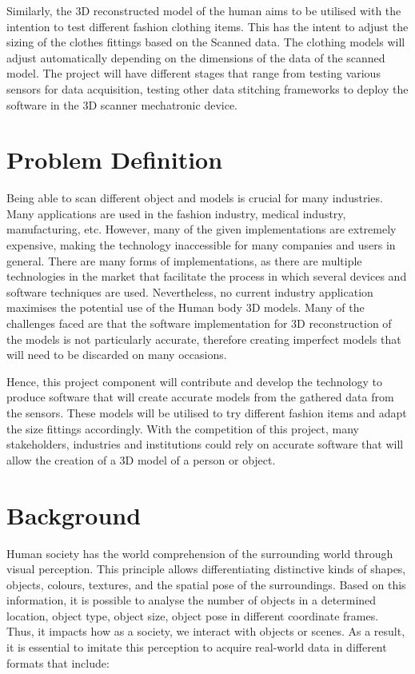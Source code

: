 \documentclass[12pt]{report}
\begin{document}
Similarly,  the 3D reconstructed model of the human aims to be utilised with the intention to test different fashion clothing items. This has the intent to adjust the sizing of the clothes fittings based on the Scanned data. The clothing models will adjust automatically depending on the dimensions of the data of the scanned model. 
The project will have different stages that range from testing various sensors for data acquisition, testing other data stitching frameworks to deploy the software in the 3D scanner mechatronic device.

\section{Problem Definition}
Being able to scan different object and models is crucial for many industries. Many applications are used in the fashion industry, medical industry, manufacturing, etc. However, many of the given implementations are extremely expensive,  making the technology inaccessible for many companies and users in general. 
There are many forms of implementations, as there are multiple technologies in the market that facilitate the process in which several devices and software techniques are used. Nevertheless,  no current industry application maximises the potential use of the Human body 3D models.
Many of the challenges faced are that the software implementation for 3D reconstruction of the models is not particularly accurate, therefore creating imperfect models that will need to be discarded on many occasions.

Hence, this project component will contribute and develop the technology to produce software that will create accurate models from the gathered data from the sensors. These models will be utilised to try different fashion items and adapt the size fittings accordingly. 
With the competition of this project, many stakeholders, industries and institutions could rely on accurate software that will allow the creation of a 3D model of a person or object.


\enlargethispage{\baselineskip}

\section{Background}
Human society has the world comprehension of the surrounding world through visual perception. This principle allows differentiating distinctive kinds of shapes, objects, colours, textures, and the spatial pose of the surroundings.
Based on this information, it is possible to analyse the number of objects in a determined location, object type, object size, object pose in different coordinate frames. 
Thus, it impacts how as a society, we interact with objects or scenes. As a result, it is essential to imitate this perception  to acquire real-world data in different formats that include:
\end{document}
